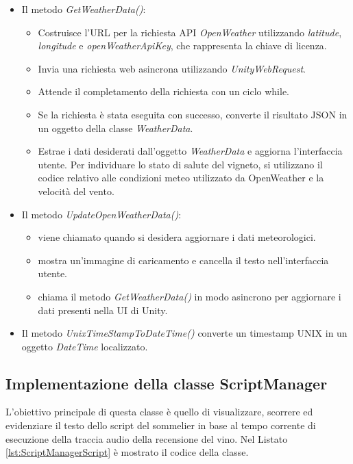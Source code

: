 \begin{itemize}
\item Il metodo \textit{GetWeatherData()}:
	\begin{itemize}
		\item Costruisce l'URL per la richiesta API \textit{OpenWeather }utilizzando \textit{latitude}, \textit{longitude} e \textit{openWeatherApiKey}, che rappresenta la chiave di licenza.
		\item Invia una richiesta web asincrona utilizzando \textit{UnityWebRequest}.
		\item Attende il completamento della richiesta con un ciclo while.
		\item Se la richiesta è stata eseguita con successo, converte il risultato JSON in un oggetto della classe \textit{WeatherData}.
		\item Estrae i dati desiderati dall'oggetto \textit{WeatherData} e aggiorna l'interfaccia utente. Per individuare lo stato di salute del vigneto, si utilizzano il codice relativo alle condizioni meteo utilizzato da OpenWeather e la velocità del vento.
	\end{itemize}
\item Il metodo \textit{UpdateOpenWeatherData()}:
	\begin{itemize}
		\item viene chiamato quando si desidera aggiornare i dati meteorologici.
		\item mostra un'immagine di caricamento e cancella il testo nell'interfaccia utente.
		\item chiama il metodo \textit{GetWeatherData()} in modo asincrono per aggiornare i dati presenti nella UI di Unity.
	\end{itemize}
\item Il metodo \textit{UnixTimeStampToDateTime()} converte un timestamp UNIX in un oggetto \textit{DateTime} localizzato.
\end{itemize}

\subsection{Implementazione della classe ScriptManager}

L'obiettivo principale di questa classe è quello di visualizzare, scorrere ed evidenziare il testo dello script del sommelier in base al tempo corrente di esecuzione della traccia audio della recensione del vino. Nel Listato \ref{lst:ScriptManagerScript} è mostrato il codice della classe.

